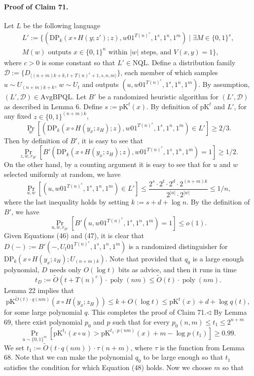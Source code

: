 \documentclass[10pt,a4paper]{article}
\begin{document}
\paragraph{Proof of Claim 71.} Let $L$ be the following language
\begin{multline*}
L':=\{(\mathrm{DP}_k(x\circ H(y;z');z),w01^{T(n)^c},1^s,1^n,1^m)\mid\exists M\in\{0,1\}^s,\\
M(w)\text{ outputs }x\in\{0,1\}^n\text{ within }|w|\text{ steps, and }V(x,y)=1\},
\end{multline*}
where $c>0$ is some constant so that $L'\in\mathrm{NQL}$. Define a distribution family $\mathcal D:=\{D_{\langle(n+m)k+k,t+T(n)^c+1,s,n,m\rangle}\}$, each member of which samples $u\sim U_{(n+m)k+k}$, $w\sim U_t$ and outputs $(u,w01^{T(n)^c},1^s,1^n,1^m)$.
By assumption, $(L',\mathcal D)\in\mathrm{AvgBPQL}$. Let $B'$ be a randomized heuristic algorithm for $(L',\mathcal D)$ as described in Lemma 6.
Define $s:=\mathrm{pK}^t(x)$. By definition of $\mathrm{pK}^t$ and $L'$, for any fixed $z\in\{0,1\}^{(n+m)k}$,
\[\Pr_w[(\mathrm{DP}_k(x\circ H(y_x;z_H);z),w01^{T(n)^c},1^s,1^n,1^m)\in L']\geq2/3.\]
Then by definition of $B'$, it is easy to see that
\[\Pr_{z,w,r_{B'}}[B'(\mathrm{DP}_k(x\circ H(y_x;z_H);z),w01^{T(n)^c},1^s,1^n,1^m)=1]\geq1/2.\tag{46}\]
On the other hand, by a counting argument it is easy to see that for $u$ and $w$ selected uniformly at random, we have
\[\Pr_{u,w}[(u,w01^{T(n)^c},1^s,1^n,1^m)\in L']\leq\frac{2^s\cdot2^t\cdot2^d\cdot2^{(n+m)k}}{2^{|u|}\cdot2^{|w|}}\leq1/n,\]
where the last inequality holds by setting $k:=s+d+\log n$. By the definition of $B'$, we have
\[\Pr_{u,w,r_{B'}}[B'(u,w01^{T(n)^c},1^s,1^n,1^m)=1]\leq o(1).\tag{47}\]
Given Equations (46) and (47), it is clear that $D(-):=B'(-,U_t01^{T(n)^c},1^s,1^n,1^m)$ is a randomized distinguisher for $\mathrm{DP}_k(x\circ H(y_x;z_H);U_{(n+m)k})$. Note that provided that $q_0$ is a large enough polynomial, $D$ needs only $O(\log t)$ bits as advice, and then it runs in time
\[t_D:=\widetilde O(t+T(n)^c)\cdot\operatorname{poly}(nm)\leq\widetilde O(t)\cdot\operatorname{poly}(nm).\]
Lemma 22 implies that
\[\mathrm{pK}^{\widetilde O(t)\cdot q(nm)}(x\circ H(y_x;z_H))\leq k+O(\log t)\leq\mathrm{pK}^t(x)+d+\log q(t),\]
for some large polynomial $q$. This completes the proof of Claim 71.\hfill$\triangleleft$
By Lemma 69, there exist polynomial $p_0$ and $p$ such that for every $p_0(n,m)\leq t_1\leq2^{n+m}$
\[\Pr_{u\sim\{0,1\}^m}[\mathrm{pK}^{t_1}(x\circ u)>\mathrm{pK}^{t_1\cdot p(nm)}(x)+m-\log p(t_1)]\geq0.99.\tag{48}\]
We set $t_1:=\widetilde O(t\cdot q(nm))\cdot\tau(n+m)$, where $\tau$ is the function from Lemma 68. Note that we can make the polynomial $q_0$ to be large enough so that $t_1$ satisfies the condition for which Equation (48) holds. Now we choose $m$ so that
\end{document}
